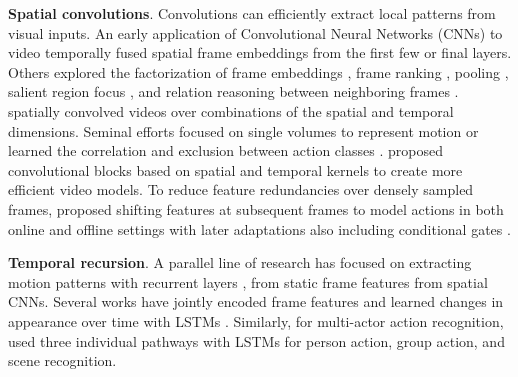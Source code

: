 \noindent
\textbf{Spatial convolutions}. Convolutions can efficiently extract local patterns from visual inputs. An early application of Convolutional Neural Networks (CNNs) to video \citep{karpathy2014large} temporally fused spatial frame embeddings from the first few or final layers. Others explored the factorization of frame embeddings \citep{sun2015human}, frame ranking \citep{fernando2015modeling}, pooling \citep{fernando2016rank}, salient region focus \citep{girdhar2017attentional, zong2021motion}, and relation reasoning between neighboring frames \citep{zhou2018temporal}. \citet{le2011learning} spatially convolved videos over combinations of the spatial and temporal dimensions. Seminal efforts focused on single volumes to represent motion \citep{bilen2016dynamic,chung2016signs,iosifidis2012view} or learned the correlation and exclusion between action classes \citep{hoai2015improving}. \citet{tran2018closer} proposed convolutional blocks based on spatial and temporal kernels to create more efficient video models. To reduce feature redundancies over densely sampled frames, \citet{lin2019tsm} proposed shifting features at subsequent frames to model actions in both online and offline settings with later adaptations also including conditional gates \citep{sudhakaran2020gate}.

\noindent
\textbf{Temporal recursion}. A parallel line of research has focused on extracting motion patterns with recurrent layers \citep{ballas2015delving,dwibedi2018temporal,kapidis2019multitask,perrett2019ddlstm,yue2015beyond,ullah2017action}, from static frame features from spatial CNNs. Several works have jointly encoded frame features and learned changes in appearance over time with LSTMs \citep{donahue2015long,srivastava2015unsupervised}. Similarly, for multi-actor action recognition, \citet{wang2017recurrent} used three individual pathways with LSTMs for person action, group action, and scene recognition.



